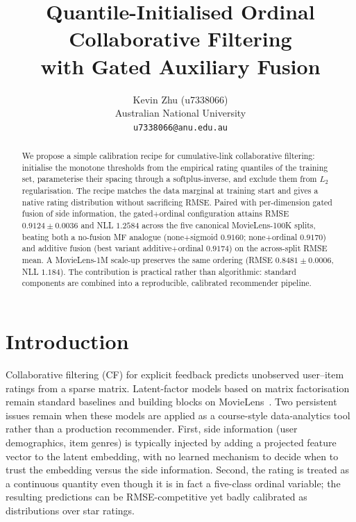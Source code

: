 \documentclass[a4paper]{article} %
\title{Quantile-Initialised Ordinal Collaborative Filtering\\ with Gated Auxiliary Fusion}
\author{
  Kevin Zhu (u7338066) \\ Australian National University \\ \texttt{u7338066@anu.edu.au}
}
\begin{document}
\maketitle

\begin{abstract}
We propose a simple calibration recipe for cumulative-link collaborative
filtering: initialise the monotone thresholds from the empirical rating
quantiles of the training set, parameterise their spacing through a
softplus-inverse, and exclude them from $L_2$ regularisation. The recipe
matches the data marginal at training start and gives a native rating
distribution without sacrificing RMSE. Paired with per-dimension gated fusion
of side information, the gated$+$ordinal configuration attains
RMSE $0.9124\pm0.0036$ and NLL $1.2584$ across the five canonical
MovieLens-100K splits, beating both a no-fusion MF analogue
(none$+$sigmoid $0.9160$; none$+$ordinal $0.9170$) and additive fusion
(best variant additive$+$ordinal $0.9174$) on the across-split RMSE mean. A MovieLens-1M
scale-up preserves the same ordering (RMSE $0.8481\pm0.0006$,
NLL $1.184$). The contribution is practical rather than algorithmic:
standard components are combined into a reproducible, calibrated recommender
pipeline.
\end{abstract}

\section{Introduction}
\label{sec:intro}

Collaborative filtering (CF) for explicit feedback predicts unobserved user--item
ratings from a sparse matrix. Latent-factor models based on matrix
factorisation~\cite{koren2009mf} remain standard baselines and building blocks
on MovieLens~\cite{harper2015movielens}.
Two persistent issues remain when these models are applied as a course-style
data-analytics tool rather than a production recommender. First, side
information (user demographics, item genres) is typically injected by adding a
projected feature vector to the latent embedding, with no learned mechanism to
decide when to trust the embedding versus the side information. Second,
the rating is treated as a continuous quantity even though it is in fact a
five-class ordinal variable; the resulting predictions can be RMSE-competitive
yet badly calibrated as distributions over star ratings.
\end{document}
